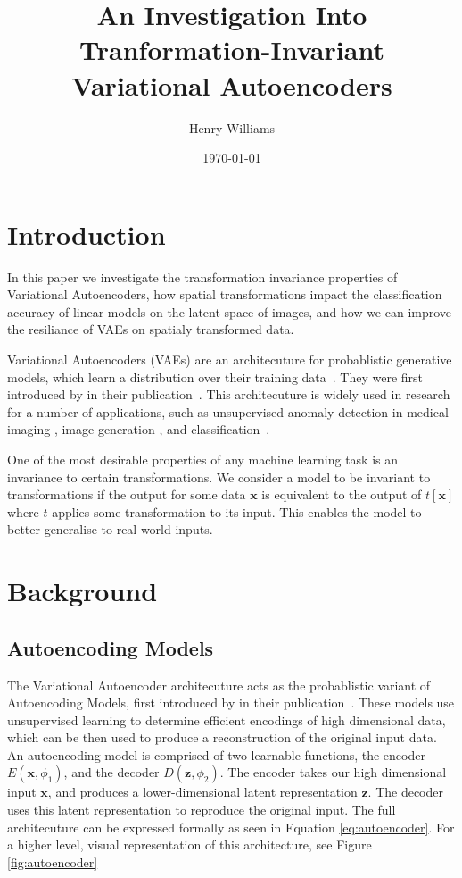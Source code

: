\documentclass[twocolumn]{article}
\title{An Investigation Into Tranformation-Invariant Variational Autoencoders}
\author{Henry Williams}
\date{\today}
\begin{document}
\maketitle

\section{Introduction}

In this paper we investigate the transformation invariance properties of Variational Autoencoders, how spatial transformations impact the classification accuracy of linear models on the latent space of images, and how we can improve the resiliance of VAEs on spatialy transformed data. 

Variational Autoencoders (VAEs) are an architecuture for probablistic generative models, which learn a distribution over their training data~\cite{prince2023understanding}. They were first introduced by \citeauthor{kingma2022autoencodingvariationalbayes} in their \citeyear{kingma2022autoencodingvariationalbayes} publication~\cite{kingma2022autoencodingvariationalbayes}. This architecuture is widely used in research for a number of applications, such as unsupervised anomaly detection in medical imaging \cite{baur2021autoencoders}, image generation \cite{vahdat2021nvaedeephierarchicalvariational}, and classification~\cite{chamin2022end}. 

One of the most desirable properties of any machine learning task is an invariance to certain transformations. We consider a model to be invariant to transformations if the output for some data \(\textbf{x}\) is equivalent to the output of \(t\left[\textbf{x}\right]\) where \(t\) applies some transformation to its input. This enables the model to better generalise to real world inputs.

\section{Background}

\subsection{Autoencoding Models}

The Variational Autoencoder architecuture acts as the probablistic variant of Autoencoding Models, first introduced by \citeauthor{rumelhart1986learning} in their \citeyear{rumelhart1986learning} publication~\cite{rumelhart1986learning}. These models use unsupervised learning to determine efficient encodings of high dimensional data, which can be then used to produce a reconstruction of the original input data. An autoencoding model is comprised of two learnable functions, the encoder \(E\left(\textbf{x}, \phi_1\right)\), and the decoder \(D\left(\textbf{z}, \phi_2\right)\). The encoder takes our high dimensional input \(\mathbf{x}\), and produces a lower-dimensional latent representation \(\mathbf{z}\). The decoder uses this latent representation to reproduce the original input. The full architecuture can be expressed formally as seen in Equation \ref{eq:autoencoder}. For a higher level, visual representation of this architecture, see Figure \ref{fig:autoencoder} 
\end{document}
